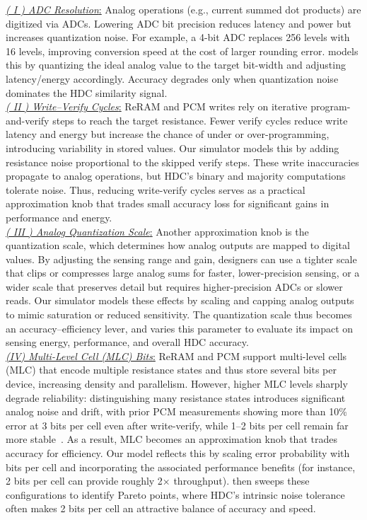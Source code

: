 \noindent
\underline{\textit{( I ) ADC Resolution}:} Analog operations (e.g., current summed dot products) are digitized via ADCs. Lowering ADC bit precision reduces latency and power but increases quantization noise. For example, a 4-bit ADC replaces 256 levels with 16 levels, improving conversion speed at the cost of larger rounding error. \pname{} models this by quantizing the ideal analog value to the target bit-width and adjusting latency/energy accordingly. Accuracy degrades only when quantization noise dominates the HDC similarity signal.\\
\underline{\textit{( II ) Write–Verify Cycles}:} ReRAM and PCM writes rely on iterative program-and-verify steps to reach the target resistance. Fewer verify cycles reduce write latency and energy but increase the chance of under or over-programming, introducing variability in stored values. Our simulator models this by adding resistance noise proportional to the skipped verify steps. These write inaccuracies propagate to analog operations, but HDC's binary and majority computations tolerate noise. Thus, reducing write-verify cycles serves as a practical approximation knob that trades small accuracy loss for significant gains in performance and energy.\\
\underline{\textit{( III ) Analog Quantization Scale}:} Another approximation knob is the quantization scale, which determines how analog outputs are mapped to digital values. By adjusting the sensing range and gain, designers can use a tighter scale that clips or compresses large analog sums for faster, lower-precision sensing, or a wider scale that preserves detail but requires higher-precision ADCs or slower reads. Our simulator models these effects by scaling and capping analog outputs to mimic saturation or reduced sensitivity. The quantization scale thus becomes an accuracy–efficiency lever, and \pname{} varies this parameter to evaluate its impact on sensing energy, performance, and overall HDC accuracy.\\
\underline{\textit{(IV) Multi-Level Cell (MLC) Bits}:} ReRAM and PCM support multi-level cells (MLC) that encode multiple resistance states and thus store several bits per device, increasing density and parallelism. However, higher MLC levels sharply degrade reliability: distinguishing many resistance states introduces significant analog noise and drift, with prior PCM measurements showing more than 10\% error at 3 bits per cell even after write-verify, while 1–2 bits per cell remain far more stable~\cite{SpecPCM2024}. As a result, MLC becomes an approximation knob that trades accuracy for efficiency. Our model reflects this by scaling error probability with bits per cell and incorporating the associated performance benefits (for instance, 2 bits per cell can provide roughly 2× throughput). \pname{} then sweeps these configurations to identify Pareto points, where HDC’s intrinsic noise tolerance often makes 2 bits per cell an attractive balance of accuracy and speed.
